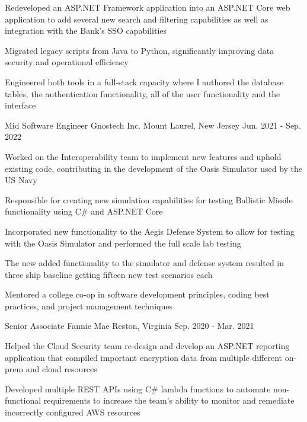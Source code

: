 \begin{cventries}
{\begin{cvitems}
        \item {Redeveloped an ASP.NET Framework application into an ASP.NET Core web application to add several new search and filtering capabilities as well as integration with the Bank's SSO capabilities}
        \item {Migrated legacy scripts from Java to Python, significantly improving data security and operational efficiency}
        \item {Engineered both tools in a full-stack capacity where I authored the database tables, the authentication functionality, all of the user functionality and the interface}
      \end{cvitems}
    }
  \cventry
    {Mid Software Engineer}
    {Gnostech Inc.}
    {Mount Laurel, New Jersey}
    {Jun. 2021 - Sep. 2022}
    {
      \begin{cvitems}
        \item {Worked on the Interoperability team to implement new features and uphold existing code, contributing in the development of the Oasis Simulator used by the US Navy}
        \item {Responsible for creating new simulation capabilities for testing Ballistic Missile functionality using C\# and ASP.NET Core}
        \item {Incorporated new functionality to the Aegis Defense System to allow for testing with the Oasis Simulator and performed the full scale lab testing}
        \item {The new added functionality to the simulator and defense system resulted in three ship baseline getting fifteen new test scenarios each}
        \item {Mentored a college co-op in software development principles, coding best practices, and project management techniques}
      \end{cvitems}
    }
  \cventry
    {Senior Associate}
    {Fannie Mae}
    {Reston, Virginia}
    {Sep. 2020 - Mar. 2021}
    {
      \begin{cvitems}
        \item {Helped the Cloud Security team re-design and develop an ASP.NET reporting application that compiled important encryption data from multiple different on-prem and cloud resources}
        \item {Developed multiple REST APIs using C\# lambda functions to automate non-functional requirements to increase the team's ability to monitor and remediate incorrectly configured AWS resources}

\end{cvitems}}
\end{cventries}
